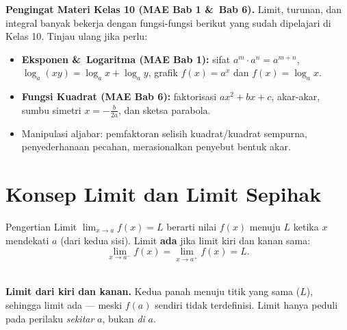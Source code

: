 \documentclass[11pt,a4paper]{report}
\theoremstyle{gaya}
\begin{document}
\begin{catatan}
\textbf{Pengingat Materi Kelas 10 (MAE Bab 1 \&\ Bab 6).} Limit, turunan, dan integral banyak bekerja dengan fungsi-fungsi berikut yang sudah dipelajari di Kelas 10. Tinjau ulang jika perlu:
\begin{itemize}[leftmargin=*,topsep=2pt]
  \item \textbf{Eksponen \&\ Logaritma (MAE Bab 1):} sifat $a^m\cdot a^n=a^{m+n}$, $\log_a(xy)=\log_a x+\log_a y$, grafik $f(x)=a^x$ dan $f(x)=\log_a x$.
  \item \textbf{Fungsi Kuadrat (MAE Bab 6):} faktorisasi $ax^2+bx+c$, akar-akar, sumbu simetri $x=-\tfrac{b}{2a}$, dan sketsa parabola.
  \item Manipulasi aljabar: pemfaktoran selisih kuadrat/kuadrat sempurna, penyederhanaan pecahan, merasionalkan penyebut bentuk akar.
\end{itemize}
\end{catatan}

\section{Konsep Limit dan Limit Sepihak}
\begin{konsep}{Pengertian Limit}
$\displaystyle\lim_{x\to a}f(x)=L$ berarti nilai $f(x)$ menuju $L$ ketika $x$ mendekati $a$ (dari kedua sisi). Limit \textbf{ada} jika limit kiri dan kanan sama:
\[
\lim_{x\to a^-}f(x)=\lim_{x\to a^+}f(x)=L.
\]
\end{konsep}

\begin{center}
\\
\small \textbf{Limit dari kiri dan kanan.} Kedua panah menuju titik yang sama ($L$), sehingga limit ada --- meski $f(a)$ sendiri tidak terdefinisi. Limit hanya peduli pada perilaku \emph{sekitar} $a$, bukan \emph{di} $a$.
\end{center}
\end{document}
